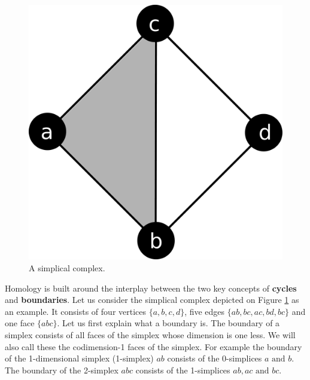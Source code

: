\begin{figure}[h]%
    \centering
    \includegraphics[scale=0.08]{./images/simplex/complex-romb.pdf}%
    \caption{A simplical complex.}%
    \label{fig:hom-sc}%
\end{figure}

Homology is built around the interplay between the two key concepts of \textbf{cycles} and \textbf{boundaries}. Let us consider the simplical complex depicted on Figure \ref{fig:hom-sc} as an example. It consists of four vertices $\{a, b, c, d\}$, five edges $\{ab, bc, ac, bd, bc\}$ and one face $\{abc\}$. Let us first explain what a boundary is. The boundary of a simplex consists of all faces of the simplex whose dimension is one less. We will also call these the codimension-1 faces of the simplex. For example the boundary of the 1-dimensional simplex (1-simplex) $ab$ consists of the 0-simplices $a \text{ and } b$. The boundary of the 2-simplex $abc$ consists of the 1-simplices $ab, ac \text{ and } bc$.

